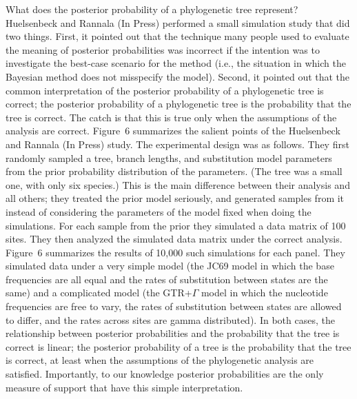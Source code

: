 \documentclass{svmult}
\begin{document}
What does the  posterior probability of a phylogenetic tree represent?
Huelsenbeck and Rannala (In Press) performed a small simulation study that did two things. First, it pointed out that the technique many people used to
evaluate the meaning of posterior probabilities was incorrect if the intention was to investigate the best-case scenario for the method (i.e., the situation in
which the Bayesian method does not misspecify the model). Second, it pointed out that the common interpretation of the posterior probability of a phylogenetic
tree is correct; the posterior probability of a phylogenetic tree is the probability that the tree is correct. The catch is that this is true only when the assumptions of the
analysis are correct. Figure~6 summarizes the salient points of the Huelsenbeck and Rannala (In Press) study. The experimental design was as follows. They first
randomly sampled a tree, branch lengths, and substitution model parameters from the prior probability distribution of the parameters. (The tree was a small one, with only
six species.) This is the main difference
between their analysis and all others; they treated the prior model seriously, and generated samples from it instead of considering the parameters of the model fixed
when doing the simulations. For each sample from the prior they simulated a data matrix of 100 sites. They then analyzed the simulated data matrix under the correct
analysis. Figure~6 summarizes the results of 10,000 such simulations for each panel. They simulated data under a very simple model (the JC69 model in which
the base frequencies are all equal and the rates of substitution between states are the same) and a complicated model (the GTR+$\Gamma$ model in which the nucleotide frequencies are free to vary, the rates of substitution between states are allowed to differ, and the rates across sites are gamma distributed). In both
cases, the relationship between posterior probabilities and the probability that the tree is correct is linear; the posterior probability of a tree is the probability that
the tree is correct, at least when the assumptions of the phylogenetic analysis are satisfied. Importantly, to our knowledge posterior probabilities are the only measure
of support that have this simple interpretation.
\end{document}
